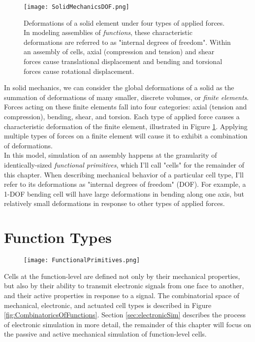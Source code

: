 {\begin{figure}
  \texttt{[image: SolidMechanicsDOF.png]}
  \caption{Deformations of a solid element under four types of applied forces.  In modeling assemblies of \textit{functions}, these characteristic deformations are referred to as "internal degrees of freedom".  Within an assembly of cells, axial (compression and tension) and shear forces cause translational displacement and bending and torsional forces cause rotational displacement.}
  \label{fig:SolidMechanicsDOF}
\end{figure}

In solid mechanics, we can consider the global deformations of a solid as the summation of deformations of many smaller, discrete volumes, or \textit{finite elements}.  Forces acting on these finite elements fall into four categories: axial (tension and compression), bending, shear, and torsion.  Each type of applied force causes a characteristic deformation of the finite element, illustrated in Figure \ref{fig:SolidMechanicsDOF}.  Applying multiple types of forces on a finite element will cause it to exhibit a combination of deformations.\\

In this model, simulation of an assembly happens at the granularity of identically-sized \textit{functional primitives}, which I'll call "cells" for the remainder of this chapter.  When describing mechanical behavior of a particular cell type, I'll refer to its deformations as "internal degrees of freedom" (DOF).  For example, a 1-DOF bending cell will have large deformations in bending along one axis, but relatively small deformations in response to other types of applied forces.\\

\section{Function Types}

\begin{figure}
  \texttt{[image: FunctionalPrimitives.png]}
  \caption{}
  \label{fig:FunctionalPrimitives}
\end{figure}


Cells at the function-level are defined not only by their mechanical properties, but also by their ability to transmit electronic signals from one face to another, and their active properties in response to a signal. The combinatorial space of mechanical, electronic, and actuated cell types is described in Figure \ref{fig:CombinatoricsOfFunctions}.  Section \ref{sec:electronicSim} describes the process of electronic simulation in more detail, the remainder of this chapter will focus on the passive and active mechanical simulation of function-level cells.
\\

}
